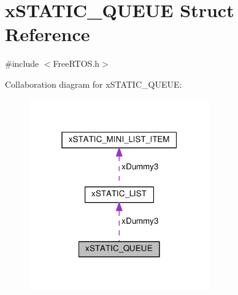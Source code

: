 \hypertarget{structx_s_t_a_t_i_c___q_u_e_u_e}{}\section{x\+S\+T\+A\+T\+I\+C\+\_\+\+Q\+U\+E\+UE Struct Reference}
\label{structx_s_t_a_t_i_c___q_u_e_u_e}


{\ttfamily \#include $<$Free\+R\+T\+O\+S.\+h$>$}



Collaboration diagram for x\+S\+T\+A\+T\+I\+C\+\_\+\+Q\+U\+E\+UE\+:\nopagebreak
\begin{figure}[H]
\begin{center}
\leavevmode
\includegraphics[width=220pt]{structx_s_t_a_t_i_c___q_u_e_u_e__coll__graph}
\end{center}
\end{figure}
